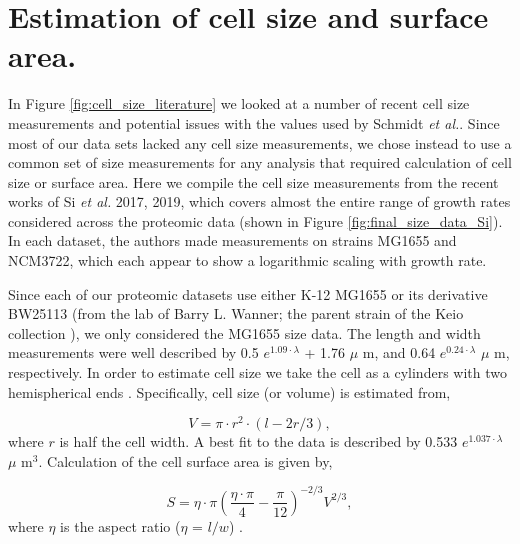 \section{Estimation of cell size and surface area.}

In Figure \ref{fig:cell_size_literature} we looked at a number of recent cell
size measurements and potential issues with the values used by Schmidt
\textit{et al.}. Since most of our data sets lacked any cell size measurements,
we chose instead to use a common set of size measurements for any analysis
that required calculation of cell size or surface area. Here we compile the
cell size measurements from the recent works of Si \textit{et al.} 2017, 2019,
which covers almost the entire range of growth rates considered across the
proteomic data (shown in Figure \ref{fig:final_size_data_Si}). In each dataset,
the authors made measurements on strains MG1655 and NCM3722, which each appear
to show a logarithmic scaling with growth rate.

Since each of our proteomic datasets use either K-12 MG1655 or its derivative
BW25113 (from the lab of Barry L. Wanner; the parent strain of the Keio
collection \citep{datsenko2000, baba2006}), we only considered the MG1655 size
data. The length and width measurements  were well described by 0.5 $e^{1.09
\cdot \lambda}$ + 1.76 $\mu$ m, and 0.64 $e^{0.24 \cdot \lambda}$ $\mu$ m,
respectively. In order to estimate cell size we take the cell as a cylinders
with two hemispherical ends \citep{si2017, basan2015}. Specifically,  cell size
(or volume) is estimated from,

\begin{equation}
V = \pi \cdot r^2 \cdot (l - 2r/3),
\label{eq:cell_size}
\end{equation}
where $r$ is half the cell width. A best fit to the data is described by 0.533
$e^{1.037 \cdot \lambda}$ $\mu$ m$^3$. Calculation of the cell surface area is
given by,

\begin{equation}
 S = \eta \cdot \pi (\frac{\eta \cdot \pi}{4} - \frac{\pi}{12})^{-2/3} V^{2/3},
\end{equation}
where $\eta$ is the aspect ratio ($\eta$ = $l/w$) \citep{ojkic2019}.

